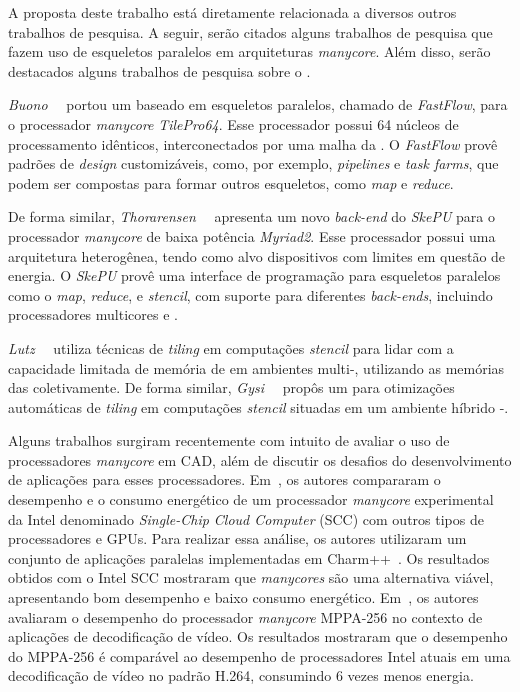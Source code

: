 A proposta deste trabalho está diretamente relacionada a diversos outros trabalhos de pesquisa.
A seguir, serão citados alguns trabalhos de pesquisa que fazem uso de esqueletos paralelos em
arquiteturas \textit{manycore}. Além disso, serão destacados alguns trabalhos de pesquisa sobre
o \mppa.


\emph{Buono}~\etal~\cite{buono13} portou um \fw baseado em esqueletos paralelos,
chamado de \emph{FastFlow}, para o processador \textit{manycore} \emph{TilePro64}.
Esse processador possui 64 núcleos de processamento idênticos, interconectados
por uma malha da \noc. O \fw \emph{FastFlow} provê padrões de \textit{design}
customizáveis, como, por exemplo, \textit{pipelines} e \textit{task farms},
que podem ser compostas para formar outros esqueletos, como \textit{map} e
\textit{reduce}.

De forma similar, \emph{Thorarensen}~\etal~\cite{thoraransen16} apresenta um
novo \textit{back-end} do \fw \emph{SkePU} para o processador \textit{manycore}
de baixa potência \emph{Myriad2}. Esse processador possui uma arquitetura
heterogênea, tendo como alvo dispositivos com limites em questão de energia.
O \fw \emph{SkePU} provê uma interface de programação para esqueletos paralelos
como o \textit{map}, \textit{reduce}, e \textit{stencil}, com suporte para
diferentes \textit{back-ends}, incluindo processadores multicores e \gpus.

\emph{Lutz}~\etal~\cite{lutz13} utiliza técnicas de \textit{tiling} em
computações \textit{stencil} para lidar com a capacidade limitada de memória
de \gpus em ambientes multi-\gpu, utilizando as memórias das \gpus
coletivamente. De forma similar, \emph{Gysi}~\etal~\cite{gysi15} propôs um \fw
para otimizações automáticas de \textit{tiling} em computações \textit{stencil}
situadas em um ambiente híbrido \cpu{}-\gpu.


Alguns trabalhos surgiram recentemente com intuito de avaliar o uso de
processadores \emph{manycore} em CAD, além de discutir os desafios do
desenvolvimento de aplicações para esses processadores.
Em~\cite{SCCEnergy:2012}, os autores compararam o desempenho e o consumo
energético de um processador \emph{manycore} experimental da Intel denominado
\emph{Single-Chip Cloud Computer} (SCC) com outros tipos de processadores e
GPUs. Para realizar essa análise, os autores utilizaram um conjunto de
aplicações paralelas implementadas em Charm++~\cite{Charm:2012}. Os resultados
obtidos com o Intel SCC mostraram que \emph{manycores} são uma alternativa
viável, apresentando bom desempenho e baixo consumo energético.
Em~\cite{MPPA-1:2013}, os autores avaliaram o desempenho do processador
\emph{manycore} MPPA-256 no contexto de aplicações de decodificação de vídeo. Os
resultados mostraram que o desempenho do MPPA-256 é comparável ao desempenho de
processadores Intel atuais em uma decodificação de vídeo no padrão H.264,
consumindo 6 vezes menos energia.

